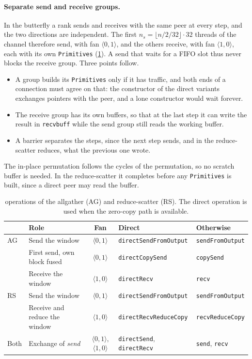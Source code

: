 \paragraph{Separate send and receive groups.}
In the butterfly a rank sends and receives with the same peer at every step, and the two directions are independent.
The first $n_s=\lfloor n/2/32\rfloor\cdot32$ threads of the channel therefore send, with fan $\langle0,1\rangle$, and the others receive, with fan $\langle1,0\rangle$, each with its own \texttt{Primitives} (\cref{tab:bfly-calls}).
A send that waits for a FIFO slot thus never blocks the receive group.
Three points follow.
\begin{itemize}
  \item A group builds its \texttt{Primitives} only if it has traffic, and both ends of a connection must agree on that: the constructor of the direct variants exchanges pointers with the peer, and a lone constructor would wait forever.
  \item The receive group has its own buffers, so that at the last step it can write the result in \texttt{recvbuff} while the send group still reads the working buffer.
  \item A barrier separates the steps, since the next step sends, and in the reduce-scatter reduces, what the previous one wrote.
\end{itemize}
The in-place permutation follows the cycles of the permutation, so no scratch buffer is needed.
In the reduce-scatter it completes before any \texttt{Primitives} is built, since a direct peer may read the buffer.

\begin{table}[t]
\centering
\footnotesize
\setlength{\tabcolsep}{4pt}
\caption{\nccl{} operations of the allgather (AG) and reduce-scatter (RS). The direct operation is used when the zero-copy path is available.}
\label{tab:bfly-calls}
\begin{tabularx}{\linewidth}{@{}l X c l l@{}}
\toprule
 & Role & Fan & Direct & Otherwise \\
\midrule
AG & Send the window & $\langle0,1\rangle$ & \texttt{directSendFromOutput} & \texttt{sendFromOutput} \\
 & First send, own block fused & $\langle0,1\rangle$ & \texttt{directCopySend} & \texttt{copySend} \\
 & Receive the window & $\langle1,0\rangle$ & \texttt{directRecv} & \texttt{recv} \\
RS & Send the window & $\langle0,1\rangle$ & \texttt{directSendFromOutput} & \texttt{sendFromOutput} \\
 & Receive and reduce the window & $\langle1,0\rangle$ & \texttt{directRecvReduceCopy} & \texttt{recvReduceCopy} \\
Both & Exchange of \emph{send} & $\langle0,1\rangle$, $\langle1,0\rangle$ & \texttt{directSend}, \texttt{directRecv} & \texttt{send}, \texttt{recv} \\
\bottomrule
\end{tabularx}
\end{table}

